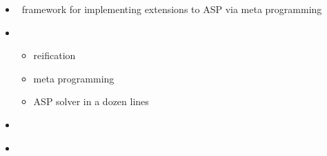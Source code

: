 \begin{frame}{\metasp}
  \begin{itemize}
  \item {} \ framework for implementing extensions to ASP via meta programming
  \item {} \
    \begin{itemize}
    \item reification
    \item meta programming
    \item ASP solver in a dozen lines
    \end{itemize}
  \item {}   \ \cite{gekasc11b,karoscwa21a}
  \item {} \ \cite{brderosc15b,digelurosc18a}
  \end{itemize}
\end{frame}
%
